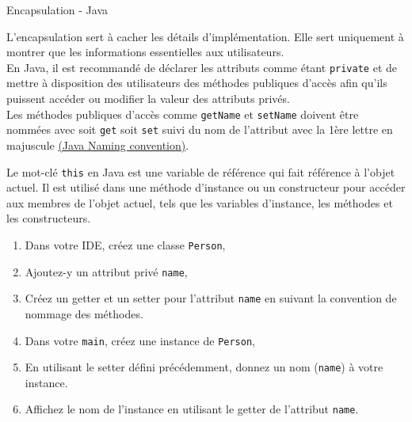 \begin{Exercice}[10 minutes]{Encapsulation - Java}

L'encapsulation sert à cacher les détails d'implémentation. Elle sert uniquement à montrer que les informations essentielles aux utilisateurs.\\

En Java, il est recommandé de déclarer les attributs comme étant \lstinline{private} et de mettre à disposition des utilisateurs des méthodes publiques d'accès afin qu'ils puissent accéder ou modifier la valeur des attributs privés.\\

Les méthodes publiques d'accès comme \lstinline{getName} et \lstinline{setName} doivent être nommées avec soit \lstinline{get} soit \lstinline{set} suivi du nom de l'attribut avec la 1ère lettre en majuscule \href{https://www.oracle.com/java/technologies/javase/codeconventions-namingconventions.html}{(Java Naming convention)}. \newline 

Le mot-clé \lstinline{this} en Java est une variable de référence qui fait référence à l'objet actuel. Il est utilisé dans une méthode d'instance ou un constructeur pour accéder aux membres de l'objet actuel, tels que les variables d'instance, les méthodes et les constructeurs. \\

\begin{enumerate}
	\item Dans votre IDE, créez une classe \lstinline{Person},
	\item Ajoutez-y un attribut privé \lstinline{name},
	\item Créez un getter et un setter pour l'attribut \lstinline{name} en suivant la convention de nommage des méthodes.
	\item Dans votre \lstinline{main}, créez une instance de \lstinline{Person}, 
	\item En utilisant le setter défini précédemment, donnez un nom (\lstinline{name}) à votre instance.
	\item Affichez le nom de l'instance en utilisant le getter de l'attribut \lstinline{name}.
\end{enumerate}
	\begin{solution}  
		 
	\end{solution}
\end{Exercice}
	
